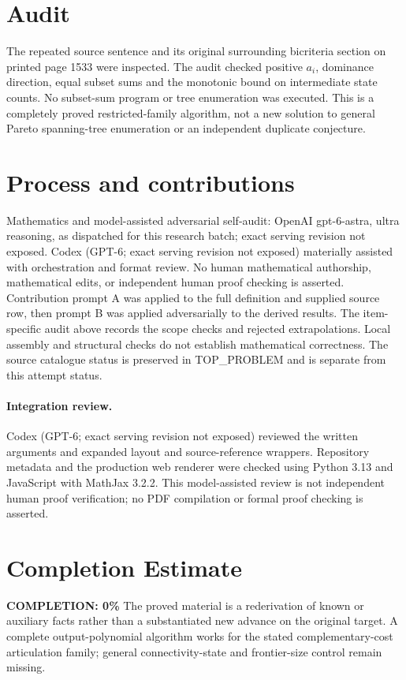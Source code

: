 \documentclass[11pt]{article}
\begin{document}
\section{Audit}
The repeated source sentence and its original surrounding bicriteria
section on printed page 1533 were inspected. The audit checked
positive $a_i$, dominance direction, equal subset sums and the
monotonic bound on intermediate state counts. No subset-sum program
or tree enumeration was executed. This is a completely proved
restricted-family algorithm, not a new solution to general Pareto
spanning-tree enumeration or an independent duplicate conjecture.

\section{Process and contributions}
Mathematics and model-assisted adversarial self-audit: OpenAI gpt-6-astra, ultra reasoning, as dispatched for this research batch; exact serving revision not exposed. Codex (GPT-6; exact serving revision not exposed) materially assisted with orchestration and format review. No human mathematical authorship, mathematical edits, or independent human proof checking is asserted.
Contribution prompt A was applied to the full definition and supplied source row, then prompt B was applied adversarially to the derived results. The item-specific audit above records the scope checks and rejected extrapolations. Local assembly and structural checks do not establish mathematical correctness. The source catalogue status is preserved in TOP\_PROBLEM and is separate from this attempt status.
\paragraph{Integration review.} Codex (GPT-6; exact serving revision not exposed) reviewed the written arguments and expanded layout and source-reference wrappers. Repository metadata and the production web renderer were checked using Python 3.13 and JavaScript with MathJax 3.2.2. This model-assisted review is not independent human proof verification; no PDF compilation or formal proof checking is asserted.

\section{Completion Estimate}
\noindent\textbf{COMPLETION: 0\%}
The proved material is a rederivation of known or auxiliary facts rather than a substantiated new advance on the original target. A complete output-polynomial algorithm works for the stated complementary-cost articulation family; general connectivity-state and frontier-size control remain missing.
\end{document}
